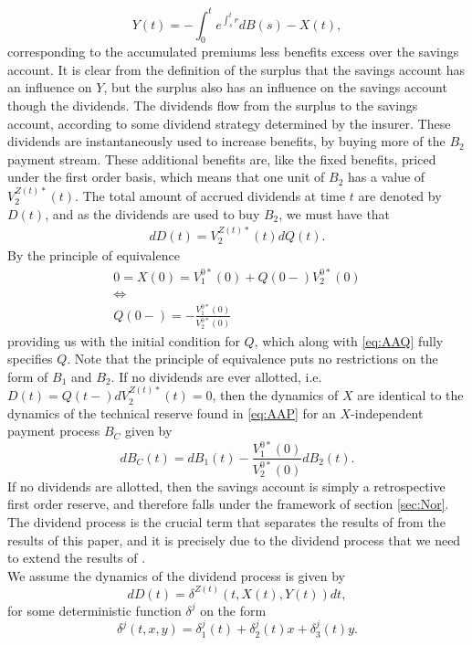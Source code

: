\documentclass[12pt]{article}
\theoremstyle{my_thm}
\begin{document}
$$
Y(t)= - \int_0^t e^{\int_s^t r} dB(s)-X(t),
$$
corresponding to the accumulated premiums less benefits excess over the savings account. It is clear from the definition of the surplus that the savings account has an influence on $Y$, but the surplus also has an influence on the savings account though the dividends. The dividends flow from the surplus to the savings account, according to some dividend strategy determined by the insurer. These dividends are instantaneously used to increase benefits, by buying more of the $B_2$ payment stream. These additional benefits are, like the fixed benefits, priced under the first order basis, which means that one unit of $B_2$ has a value of $V_2^{Z(t)*}(t)$. The total amount of accrued dividends at time $t$ are denoted by $D(t)$, and as the dividends are used to buy $B_2$, we must have that
\begin{align}
dD(t)=V_2^{Z(t)*}(t)dQ(t). \label{eq:AAQ}
\end{align}
By the principle of equivalence
\begin{gather*}
0=X(0)=V_1^{0*}(0)+Q(0-)V_2^{0*}(0)
\\
\Leftrightarrow
\\
Q(0-)=-\frac{V_1^{0*}(0)}{V_2^{0*}(0)}
\end{gather*}
providing us with the initial condition for $Q$, which along with \eqref{eq:AAQ} fully specifies $Q$. Note that the principle of equivalence puts no restrictions on the form of $B_1$ and $B_2$. If no dividends are ever allotted, i.e. $D(t)=Q(t-)dV_2^{Z(t)*}(t)=0$, then the dynamics of $X$ are identical to the dynamics of the technical reserve found in \eqref{eq:AAP} for an $X$-independent payment process $B_C$ given  by
$$
dB_C(t)=dB_1(t)-\frac{V_1^{0*}(0)}{V_2^{0*}(0)}dB_2(t).
$$
If no dividends are allotted, then the savings account is simply a retrospective first order reserve, and therefore falls under the framework of section \ref{sec:Nor}. The dividend process is the crucial term that separates the results of \citet{Norberg} from the results of this paper, and it is precisely due to the dividend process that we need to extend the results of \citet{Norberg}.
\\[12pt]
We assume the dynamics of the dividend process is given by
$$
dD(t)=\delta^{Z(t)}(t,X(t),Y(t)) dt,
$$
for some deterministic function $\delta^j$ on the form
\begin{equation*}
\delta^j(t,x,y)=\delta_1^j(t)+\delta_2^j(t)x+\delta_3^j(t)y.
\end{equation*}
\end{document}
